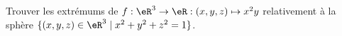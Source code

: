
\begin{exercice}\label{exoVariete0002}

Trouver les extrémums de $f: \eR^3 \rightarrow \eR : (x,y,z) \mapsto x^2y$ relativement à la sphère $\{ (x,y,z) \in \eR^3 \mid x^2 + y^2 + z^2 =1 \}$.

\end{exercice}
